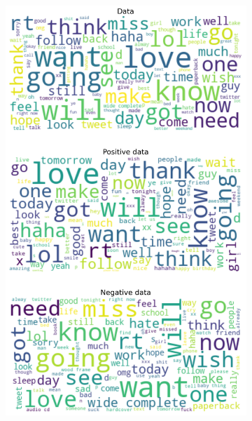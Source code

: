 \documentclass{article}
\begin{document}
\begin{itemize}
\begin{figure}[H]
\begin{subfigure}[b]{0.24\textwidth}
      \includegraphics[width=\textwidth]{chapter-06/section-01-01/11/visualization/2/wordcloud.png}
    \end{subfigure}
    \begin{subfigure}[b]{0.24\textwidth}
      \centering

\end{subfigure}
\end{figure}
\end{itemize}
\end{document}
